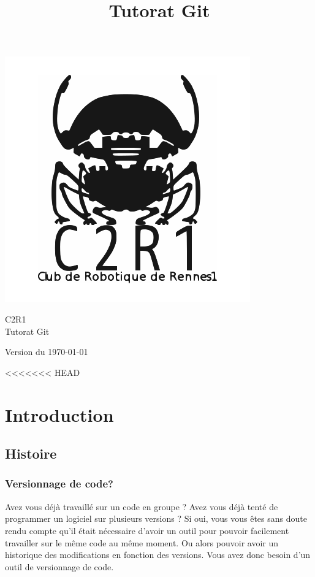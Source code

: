 \documentclass[a4paper,10pt]{report}
\title{Tutorat Git}
\begin{document}
\renewcommand{\chaptername}{Partie}

\begin{titlepage}
\vspace{-3cm}\hspace{-2cm}\includegraphics[scale=0.4]{C2R1}
\begin{center}
\vspace{2cm}
{\selectfont
\Large{C2R1}\\
\vspace{0.5cm}
\Huge{Tutorat Git}}\\
\end{center}
\begin{flushright}
 \vfill
{\selectfont
\large{Version du \today}}
\end{flushright}
\end{titlepage}

\pagestyle{fancy}

\tableofcontents
\newpage

<<<<<<< HEAD
\section{Introduction}
  \subsection{Histoire}
    \subsubsection{Versionnage de code?}
Avez vous déjà travaillé sur un code en groupe ? Avez vous déjà tenté de programmer un logiciel sur plusieurs versions ? Si oui, vous vous êtes sans doute rendu compte qu'il était nécessaire d'avoir un outil pour pouvoir facilement travailler sur le même code au même moment. Ou alors pouvoir avoir un historique des modifications en fonction des versions. Vous avez donc besoin d'un outil de versionnage de code.
\end{document}
